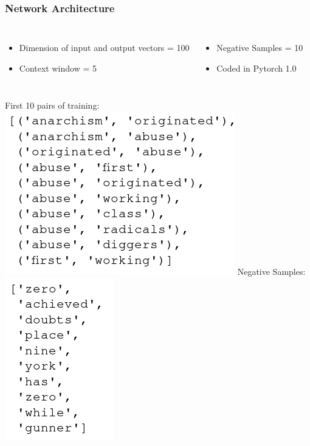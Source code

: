 \begin{frame}
\frametitle{Network Architecture} 
\begin{columns}
\begin{itemize}
\item Dimension of input and output vectors = 100
\item Context window  = 5
\end{itemize}
    \begin{itemize}
    \item Negative Samples = 10 
\item Coded in Pytorch 1.0
\end{itemize}
  \end{columns}
  \bigskip
\begin{columns}
    		First 10 pairs of training:
        \includegraphics[scale=0.35]{images/pairs_example}    
        Negative Samples:\\
        \includegraphics[scale=0.35]{images/neg_samples_example}
  \end{columns}
\end{frame}